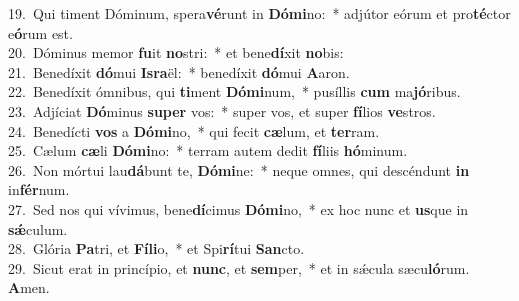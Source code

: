 {19.~}Qui timent Dóminum, spera\textbf{vé}runt in \textbf{Dó}\textbf{mi}no:~* adjútor eórum et pro\textbf{té}ctor e\textbf{ó}rum est.\\
{20.~}Dóminus memor \textbf{fu}it \textbf{no}stri:~* et bene\textbf{dí}xit \textbf{no}bis:\\
{21.~}Benedíxit \textbf{dó}mui \textbf{Is}\textbf{ra}ël:~* benedíxit \textbf{dó}mui \textbf{A}aron.\\
{22.~}Benedíxit ómnibus, qui \textbf{ti}ment \textbf{Dó}\textbf{mi}num,~* pusíllis \textbf{cum} ma\textbf{jó}ribus.\\
{23.~}Adjíciat \textbf{Dó}minus \textbf{su}\textbf{per} vos:~* super vos, et super \textbf{fí}lios \textbf{ve}stros.\\
{24.~}Benedícti \textbf{vos} a \textbf{Dó}\textbf{mi}no,~* qui fecit \textbf{cæ}lum, et \textbf{ter}ram.\\
{25.~}Cælum \textbf{cæ}li \textbf{Dó}\textbf{mi}no:~* terram autem dedit \textbf{fí}liis \textbf{hó}minum.\\
{26.~}Non mórtui lau\textbf{dá}bunt te, \textbf{Dó}\textbf{mi}ne:~* neque omnes, qui descéndunt \textbf{in} in\textbf{fér}num.\\
{27.~}Sed nos qui vívimus, bene\textbf{dí}cimus \textbf{Dó}\textbf{mi}no,~* ex hoc nunc et \textbf{us}que in \textbf{sǽ}culum.\\
{28.~}Glória \textbf{Pa}tri, et \textbf{Fí}\textbf{li}o,~* et Spi\textbf{rí}tui \textbf{San}cto.\\
{29.~}Sicut erat in princípio, et \textbf{nunc}, et \textbf{sem}per,~* et in sǽcula sæcu\textbf{ló}rum. \textbf{A}men.\\
